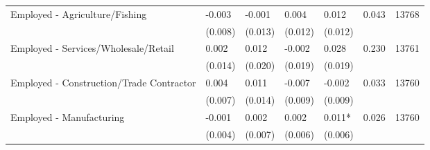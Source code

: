 \documentclass[8pt,a4paper,landscape]{article}
\newcommand{\sym}[1]{#1} %
\begin{document}
\begin{tabular}{lllllll}
Employed - Agriculture/Fishing&      -0.003         &      -0.001         &       0.004         &       0.012         &       0.043         &   13768         \\
            &     (0.008)         &     (0.013)         &     (0.012)         &     (0.012)         &                     &                     \\
Employed - Services/Wholesale/Retail&       0.002         &       0.012         &      -0.002         &       0.028         &       0.230         &   13761         \\
            &     (0.014)         &     (0.020)         &     (0.019)         &     (0.019)         &                     &                     \\
Employed - Construction/Trade Contractor&       0.004         &       0.011         &      -0.007         &      -0.002         &       0.033         &   13760         \\
            &     (0.007)         &     (0.014)         &     (0.009)         &     (0.009)         &                     &                     \\
Employed - Manufacturing&      -0.001         &       0.002         &       0.002         &       0.011\sym{*}  &       0.026         &   13760         \\
            &     (0.004)         &     (0.007)         &     (0.006)         &     (0.006)         &                     &                     \\
\bottomrule
\end{tabular}
\end{document}
